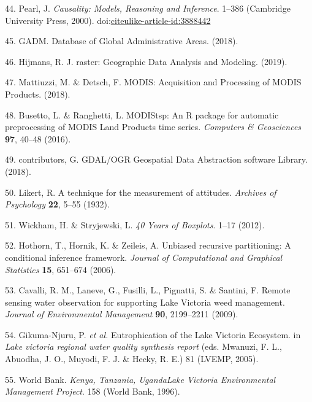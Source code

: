 \documentclass[12pt,oneside]{article}
\begin{document}
\leavevmode\hypertarget{ref-Pearl_2000}{}%
44. Pearl, J. \emph{Causality: Models, Reasoning and Inference}. 1--386 (Cambridge University Press, 2000). doi:\href{https://doi.org/citeulike-article-id:3888442}{citeulike-article-id:3888442}

\leavevmode\hypertarget{ref-GADM_2018}{}%
45. GADM. Database of Global Administrative Areas. (2018).

\leavevmode\hypertarget{ref-Hijmans_2019}{}%
46. Hijmans, R. J. raster: Geographic Data Analysis and Modeling. (2019).

\leavevmode\hypertarget{ref-Mattiuzzi_and_Detsch_2018}{}%
47. Mattiuzzi, M. \& Detsch, F. MODIS: Acquisition and Processing of MODIS Products. (2018).

\leavevmode\hypertarget{ref-Busetto_and_ranghetti_2016}{}%
48. Busetto, L. \& Ranghetti, L. MODIStsp: An R package for automatic preprocessing of MODIS Land Products time series. \emph{Computers \& Geosciences} \textbf{97}, 40--48 (2016).

\leavevmode\hypertarget{ref-GDAL_OGRcontributors_2018}{}%
49. contributors, G. GDAL/OGR Geospatial Data Abstraction software Library. (2018).

\leavevmode\hypertarget{ref-Likert_1932}{}%
50. Likert, R. A technique for the measurement of attitudes. \emph{Archives of Psychology} \textbf{22}, 5--55 (1932).

\leavevmode\hypertarget{ref-Wickham_and_Stryjewski_2012}{}%
51. Wickham, H. \& Stryjewski, L. \emph{40 Years of Boxplots}. 1--17 (2012).

\leavevmode\hypertarget{ref-Hothorn_et_al_2006}{}%
52. Hothorn, T., Hornik, K. \& Zeileis, A. Unbiased recursive partitioning: A conditional inference framework. \emph{Journal of Computational and Graphical Statistics} \textbf{15}, 651--674 (2006).

\leavevmode\hypertarget{ref-Cavalli_et_al_2009}{}%
53. Cavalli, R. M., Laneve, G., Fusilli, L., Pignatti, S. \& Santini, F. Remote sensing water observation for supporting Lake Victoria weed management. \emph{Journal of Environmental Management} \textbf{90}, 2199--2211 (2009).

\leavevmode\hypertarget{ref-Gikuma-Njuru_et_al_2005}{}%
54. Gikuma-Njuru, P. \emph{et al.} Eutrophication of the Lake Victoria Ecosystem. in \emph{Lake victoria regional water quality synthesis report} (eds. Mwanuzi, F. L., Abuodha, J. O., Muyodi, F. J. \& Hecky, R. E.) 81 (LVEMP, 2005).

\leavevmode\hypertarget{ref-World_Bank_1996}{}%
55. World Bank. \emph{Kenya, Tanzania, UgandaLake Victoria Environmental Management Project}. 158 (World Bank, 1996).
\end{document}

